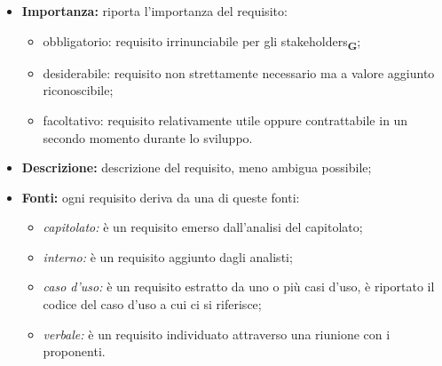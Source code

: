 \begin{itemize}
    \item \textbf{Importanza:} riporta l'importanza del requisito:
          \begin{itemize}
              \item obbligatorio: requisito irrinunciabile per gli stakeholders\textsubscript{\textbf{G}};
              \item desiderabile: requisito non strettamente necessario ma a valore aggiunto riconoscibile;
              \item facoltativo: requisito relativamente utile oppure contrattabile in un secondo momento durante lo sviluppo.
          \end{itemize}
    \item \textbf{Descrizione:} descrizione del requisito, meno ambigua possibile;
    \item \textbf{Fonti:} ogni requisito deriva da una di queste fonti:
          \begin{itemize}
              \item \textit{capitolato:} è un requisito emerso dall'analisi del capitolato;
              \item \textit{interno:} è un requisito aggiunto dagli analisti;
              \item \textit{caso d'uso:} è un requisito estratto da uno o più casi d'uso, è riportato il codice del caso d'uso a cui ci si riferisce;
              \item \textit{verbale:} è un requisito individuato attraverso una riunione con i proponenti.
          \end{itemize}
\end{itemize}

\newpage
